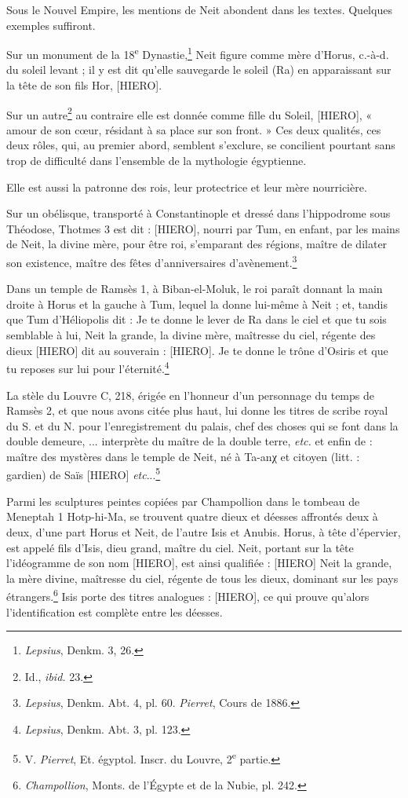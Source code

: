 \documentclass[a4paper, 11pt, oneside]{article}
\begin{document}
Sous le Nouvel Empire, les mentions de Neit abondent dans les textes. Quelques exemples suffiront.

Sur un monument de la 18\textsuperscript{e} Dynastie,\footnote{\emph{Lepsius}, Denkm. 3, 26.} Neit figure comme mère d'Horus, c.-à-d. du soleil levant ; il y est dit qu'elle sauvegarde le soleil (Ra) en apparaissant sur la tête de son fils Hor, [HIERO].

Sur un autre\footnote{Id., \emph{ibid.} 23.} au contraire elle est donnée comme fille du Soleil, [HIERO], « amour de son cœur, résidant à sa place sur son front. » Ces deux qualités, ces deux rôles, qui, au premier abord, semblent s'exclure, se concilient pourtant sans trop de difficulté dans l'ensemble de la mythologie égyptienne.

Elle est aussi la patronne des rois, leur protectrice et leur mère nourricière.

Sur un obélisque, transporté à Constantinople et dressé dans l'hippodrome sous Théodose, Thotmes 3 est dit : [HIERO], nourri par
Tum, en enfant, par les mains de Neit, la divine mère, pour être roi, s'emparant des régions, maître de dilater son existence, maître des fêtes d'anniversaires d'avènement.\footnote{\emph{Lepsius}, Denkm. Abt. 4, pl. 60. \emph{Pierret}, Cours de 1886.}

Dans un temple de Ramsès 1, à Biban-el-Moluk, le roi paraît donnant la main droite à Horus et la gauche à Tum, lequel la donne lui-même à Neit ; et, tandis que Tum d'Héliopolis dit : Je te donne le lever de Ra dans le ciel et que tu sois semblable à lui, Neit la grande, la divine mère, maîtresse du ciel, régente des dieux [HIERO] dit au souverain : [HIERO]. Je te donne le trône d'Osiris et que tu reposes sur lui pour l'éternité.\footnote{\emph{Lepsius}, Denkm. Abt. 3, pl. 123.}

La stèle du Louvre C, 218, érigée en l'honneur d'un personnage du temps de Ramsès 2, et que nous avons citée plus haut, lui donne les titres de scribe royal du S. et du N. pour l'enregistrement du palais, chef des choses qui se font dans la double demeure, ... interprète du maître de la double terre, \emph{etc.} et enfin de : maître des mystères dans le temple de Neit, né à Ta-anχ et citoyen (litt. : gardien) de Saïs [HIERO] \emph{etc}...\footnote{V. \emph{Pierret}, Et. égyptol. Inscr. du Louvre, 2\textsuperscript{e} partie.}

Parmi les sculptures peintes copiées par Champollion dans le tombeau de Meneptah 1 Hotp-hi-Ma, se trouvent quatre dieux et déesses affrontés deux à deux, d'une part Horus et Neit, de l'autre Isis et Anubis. Horus, à tête d'épervier, est appelé fils d'Isis, dieu grand, maître du ciel. Neit, portant sur la tête l'idéogramme de son nom [HIERO], est ainsi qualifiée : [HIERO] Neit la grande, la mère divine, maîtresse du ciel, régente de tous les dieux, dominant sur les pays étrangers.\footnote{\emph{Champollion}, Monts. de l'Égypte et de la Nubie, pl. 242.} Isis porte des titres analogues : [HIERO], ce qui prouve qu'alors l'identification est complète entre les déesses.
\end{document}
